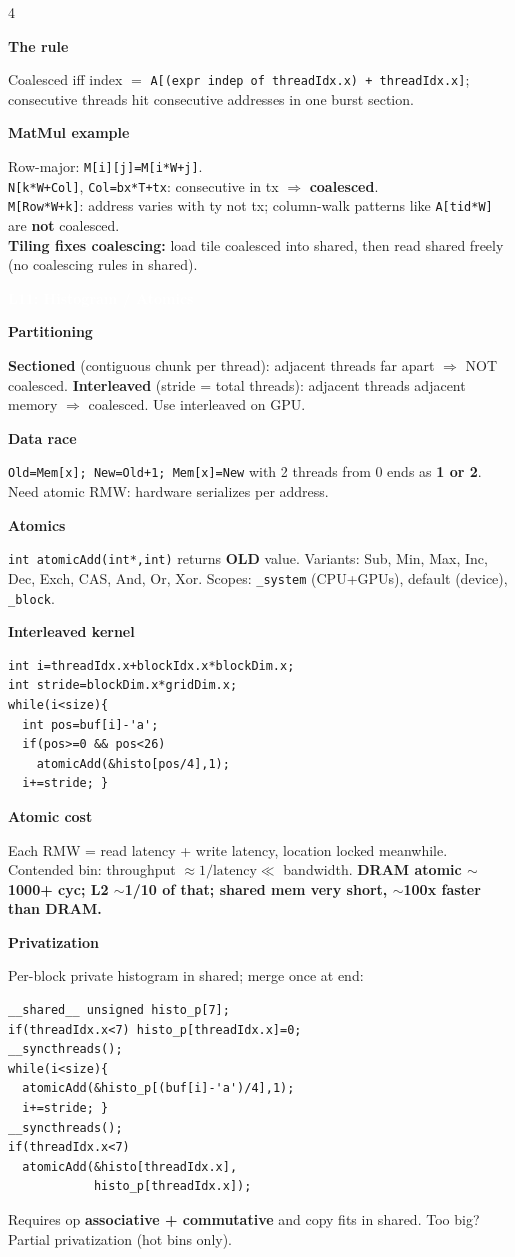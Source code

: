 \documentclass[10pt]{extarticle}
\newcommand{\sect}[1]{\vspace{3pt}\par\colorbox{hdr}{\textcolor{white}{\textbf{\small #1}}}\par\vspace{2pt}}
\newcommand{\sub}[1]{\vspace{2pt}\par\textbf{\footnotesize\textcolor{hdr}{#1}}\par}
\begin{document}
\begin{multicols*}{4}
\sub{The rule}
Coalesced iff index $=$ \texttt{A[(expr indep of threadIdx.x) + threadIdx.x]}; consecutive threads hit consecutive addresses in one burst section.

\sub{MatMul example}
Row-major: \texttt{M[i][j]=M[i*W+j]}.\\
\texttt{N[k*W+Col]}, \texttt{Col=bx*T+tx}: consecutive in tx $\Rightarrow$ \textbf{coalesced}.\\
\texttt{M[Row*W+k]}: address varies with ty not tx; column-walk patterns like \texttt{A[tid*W]} are \textbf{not} coalesced.\\
\textbf{Tiling fixes coalescing:} load tile coalesced into shared, then read shared freely (no coalescing rules in shared).

\sect{L11: Histogram / Atomics}
\sub{Partitioning}
\textbf{Sectioned} (contiguous chunk per thread): adjacent threads far apart $\Rightarrow$ NOT coalesced. \textbf{Interleaved} (stride = total threads): adjacent threads adjacent memory $\Rightarrow$ coalesced. Use interleaved on GPU.

\sub{Data race}
\texttt{Old=Mem[x]; New=Old+1; Mem[x]=New} with 2 threads from 0 ends as \textbf{1 or 2}. Need atomic RMW: hardware serializes per address.

\sub{Atomics}
\texttt{int atomicAdd(int*,int)} returns \textbf{OLD} value. Variants: Sub, Min, Max, Inc, Dec, Exch, CAS, And, Or, Xor. Scopes: \texttt{\_system} (CPU+GPUs), default (device), \texttt{\_block}.

\sub{Interleaved kernel}
\begin{lstlisting}
int i=threadIdx.x+blockIdx.x*blockDim.x;
int stride=blockDim.x*gridDim.x;
while(i<size){
  int pos=buf[i]-'a';
  if(pos>=0 && pos<26)
    atomicAdd(&histo[pos/4],1);
  i+=stride; }
\end{lstlisting}

\sub{Atomic cost}
Each RMW = read latency + write latency, location locked meanwhile. Contended bin: throughput $\approx 1/\text{latency} \ll$ bandwidth. \textbf{DRAM atomic $\sim$1000+ cyc; L2 $\sim$1/10 of that; shared mem very short, $\sim$100x faster than DRAM.}

\sub{Privatization}
Per-block private histogram in shared; merge once at end:
\begin{lstlisting}
__shared__ unsigned histo_p[7];
if(threadIdx.x<7) histo_p[threadIdx.x]=0;
__syncthreads();
while(i<size){
  atomicAdd(&histo_p[(buf[i]-'a')/4],1);
  i+=stride; }
__syncthreads();
if(threadIdx.x<7)
  atomicAdd(&histo[threadIdx.x],
            histo_p[threadIdx.x]);
\end{lstlisting}
Requires op \textbf{associative + commutative} and copy fits in shared. Too big? Partial privatization (hot bins only).


\end{multicols*}
\end{document}
